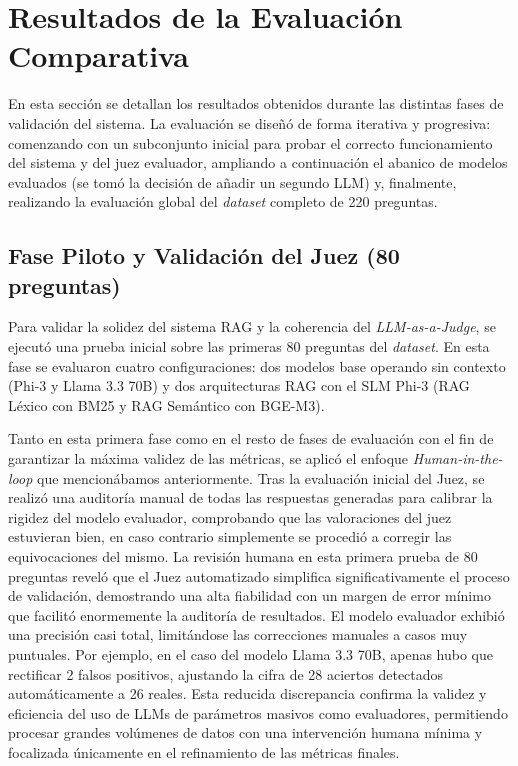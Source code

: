 \section{Resultados de la Evaluación Comparativa}

En esta sección se detallan los resultados obtenidos durante las distintas fases de validación del sistema. La evaluación se diseñó de forma iterativa y progresiva: comenzando con un subconjunto inicial para probar el correcto funcionamiento del sistema y del juez evaluador, ampliando a continuación el abanico de modelos evaluados (se tomó la decisión de añadir un segundo LLM) y, finalmente, realizando la evaluación global del \textit{dataset} completo de 220 preguntas.

\subsection{Fase Piloto y Validación del Juez (80 preguntas)}

Para validar la solidez del sistema RAG y la coherencia del \textit{LLM-as-a-Judge}, se ejecutó una prueba inicial sobre las primeras 80 preguntas del \textit{dataset}. En esta fase se evaluaron cuatro configuraciones: dos modelos base operando sin contexto (Phi-3 y Llama 3.3 70B) y dos arquitecturas RAG con el SLM Phi-3 (RAG Léxico con BM25 y RAG Semántico con BGE-M3).

Tanto en esta primera fase como en el resto de fases de evaluación con el fin de garantizar la máxima validez de las métricas, se aplicó el enfoque \textit{Human-in-the-loop} que mencionábamos anteriormente. Tras la evaluación inicial del Juez, se realizó una auditoría manual de todas las respuestas generadas para calibrar la rigidez del modelo evaluador, comprobando que las valoraciones del juez estuvieran bien, en caso contrario simplemente se procedió a corregir las equivocaciones del mismo. La revisión humana en esta primera prueba de 80 preguntas reveló que el Juez automatizado simplifica significativamente el proceso de validación, demostrando una alta fiabilidad con un margen de error mínimo que facilitó enormemente la auditoría de resultados. El modelo evaluador exhibió una precisión casi total, limitándose las correcciones manuales a casos muy puntuales. Por ejemplo, en el caso del modelo Llama 3.3 70B, apenas hubo que rectificar 2 falsos positivos, ajustando la cifra de 28 aciertos detectados automáticamente a 26 reales. Esta reducida discrepancia confirma la validez y eficiencia del uso de LLMs de parámetros masivos como evaluadores, permitiendo procesar grandes volúmenes de datos con una intervención humana mínima y focalizada únicamente en el refinamiento de las métricas finales.


